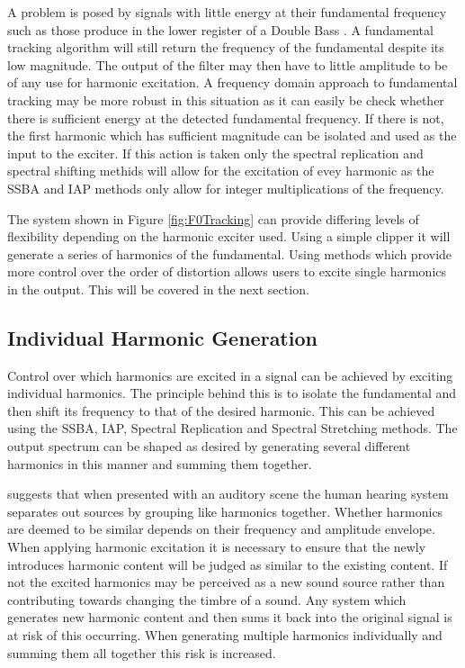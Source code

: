 		A problem is posed by signals with little energy at their fundamental frequency such as those produce in
		the lower register of a Double Bass \citep{askenfelt2010double}. A fundamental tracking algorithm will
		still return the frequency of the fundamental despite its low magnitude. The output of the filter may then
		have to little amplitude to be of any use for harmonic excitation. A frequency domain approach to
		fundamental tracking may be more robust in this situation as it can easily be check whether there is
		sufficient energy at the detected fundamental frequency. If there is not, the first harmonic which has
		sufficient magnitude can be isolated and used as the input to the exciter. If this action is taken only the
		spectral replication and spectral shifting methids will allow for the excitation of evey harmonic as the
		SSBA and IAP methods only allow for integer multiplications of the frequency.

		The system shown in Figure \ref{fig:F0Tracking} can provide differing levels of flexibility depending on
		the harmonic exciter used. Using a simple clipper it will generate a series of harmonics of the
		fundamental. Using methods which provide more control over the order of distortion allows users to excite
		single harmonics in the output. This will be covered in the next section.

	\subsection{Individual Harmonic Generation}
	\label{sec:FeatureControl-Individuals}
		Control over which harmonics are excited in a signal can be achieved by exciting individual harmonics. The
		principle behind this is to isolate the fundamental and then shift its frequency to that of the desired
		harmonic. This can be achieved using the SSBA, IAP, Spectral Replication and Spectral Stretching methods.
		The output spectrum can be shaped as desired by generating several different harmonics in this manner and
		summing them together.
		
		\citet{bregman1994auditory} suggests that when presented with an auditory scene the human hearing system
		separates out sources by grouping like harmonics together. Whether harmonics are deemed to be similar
		depends on their frequency and amplitude envelope. When applying harmonic excitation it is necessary to
		ensure that the newly introduces harmonic content will be judged as similar to the existing content. If not
		the excited harmonics may be perceived as a new sound source rather than contributing towards changing the
		timbre of a sound. Any system which generates new harmonic content and then sums it back into the original
		signal is at risk of this occurring. When generating multiple harmonics individually and summing them all
		together this risk is increased.

